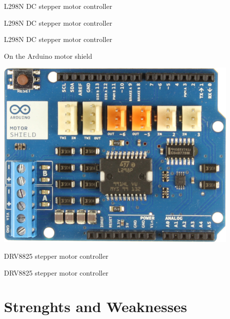\documentclass[compress]{beamer}
\begin{document}
{
    \begin{frame}{L298N DC stepper motor controller}
    \end{frame}
}

{
    \begin{frame}{L298N DC stepper motor controller}
    \end{frame}
}

{
    \begin{frame}{L298N DC stepper motor controller}
    \end{frame}
}

\begin{frame}{On the Arduino motor shield}
    \begin{center}
        \includegraphics[width=0.8\linewidth]{motorshield}
    \end{center}
\end{frame}

{
    \begin{frame}{DRV8825 stepper motor controller}
    \end{frame}
}

{
    \begin{frame}{DRV8825 stepper motor controller}
    \end{frame}
}

\section[Limits]{Strenghts and Weaknesses}
\end{document}
